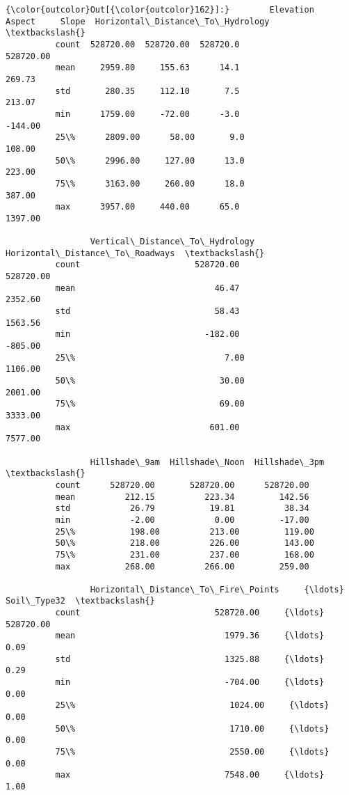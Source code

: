 \documentclass[11pt]{article}
\begin{document}
\begin{Verbatim}[commandchars=\\\{\}]
{\color{outcolor}Out[{\color{outcolor}162}]:}        Elevation     Aspect     Slope  Horizontal\_Distance\_To\_Hydrology  \textbackslash{}
          count  528720.00  528720.00  528720.0                         528720.00   
          mean     2959.80     155.63      14.1                            269.73   
          std       280.35     112.10       7.5                            213.07   
          min      1759.00     -72.00      -3.0                           -144.00   
          25\%      2809.00      58.00       9.0                            108.00   
          50\%      2996.00     127.00      13.0                            223.00   
          75\%      3163.00     260.00      18.0                            387.00   
          max      3957.00     440.00      65.0                           1397.00   
          
                 Vertical\_Distance\_To\_Hydrology  Horizontal\_Distance\_To\_Roadways  \textbackslash{}
          count                       528720.00                        528720.00   
          mean                            46.47                          2352.60   
          std                             58.43                          1563.56   
          min                           -182.00                          -805.00   
          25\%                              7.00                          1106.00   
          50\%                             30.00                          2001.00   
          75\%                             69.00                          3333.00   
          max                            601.00                          7577.00   
          
                 Hillshade\_9am  Hillshade\_Noon  Hillshade\_3pm  \textbackslash{}
          count      528720.00       528720.00      528720.00   
          mean          212.15          223.34         142.56   
          std            26.79           19.81          38.34   
          min            -2.00            0.00         -17.00   
          25\%           198.00          213.00         119.00   
          50\%           218.00          226.00         143.00   
          75\%           231.00          237.00         168.00   
          max           268.00          266.00         259.00   
          
                 Horizontal\_Distance\_To\_Fire\_Points     {\ldots}      Soil\_Type32  \textbackslash{}
          count                           528720.00     {\ldots}        528720.00   
          mean                              1979.36     {\ldots}             0.09   
          std                               1325.88     {\ldots}             0.29   
          min                               -704.00     {\ldots}             0.00   
          25\%                               1024.00     {\ldots}             0.00   
          50\%                               1710.00     {\ldots}             0.00   
          75\%                               2550.00     {\ldots}             0.00   
          max                               7548.00     {\ldots}             1.00   
          

\end{Verbatim}
\end{document}
